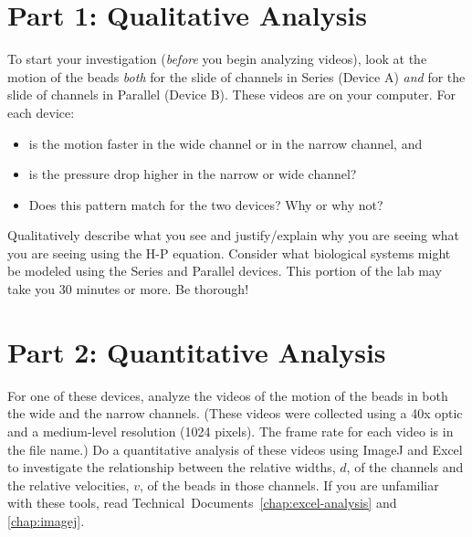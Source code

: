 \section*{Part 1: Qualitative Analysis}
To start your investigation (\emph{before} you begin analyzing videos), look at the motion of the
beads \emph{both} for the slide of channels in Series (Device A) \emph{and} for the slide of channels in Parallel (Device B).
These videos are on your computer.
For each device:
\begin{itemize}
\itemsep-0.2em
\item is the motion faster in the wide channel or in the narrow channel, and
\item is the pressure drop higher in the narrow or wide channel?
\item Does this pattern match for the two devices? Why or why not?
\end{itemize}
Qualitatively describe what you see and justify/explain why you are seeing what you are seeing using the H-P equation.
Consider what biological systems might be modeled using the Series and Parallel devices.
This portion of the lab may take you 30 minutes or more.
Be thorough!

\section*{Part 2: Quantitative Analysis}
For one of these devices, analyze the videos of the motion of the beads in both the wide and
the narrow channels.
(These videos were collected using a 40x optic and a medium-level resolution (1024 pixels).
The frame rate for each video is in the file name.)
Do a quantitative analysis of these videos using ImageJ and Excel to investigate the relationship between the relative widths, $d$, of the channels and the relative velocities, $v$, of the beads in those channels.
If you are unfamiliar with these tools, read Technical~Documents~\ref{chap:excel-analysis} and \ref{chap:imagej}.
